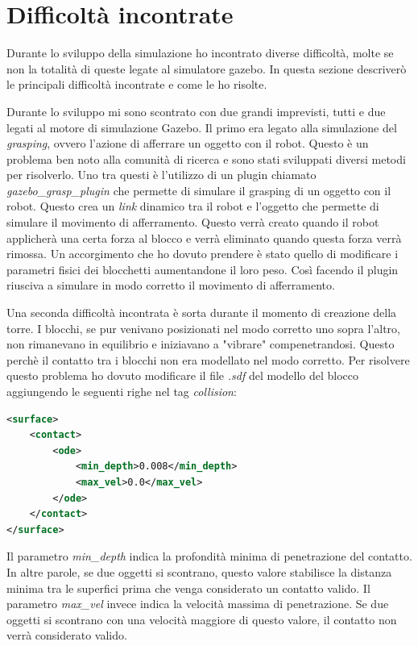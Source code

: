 \section{Difficoltà incontrate}
\label{sec:difficoltaros}
Durante lo sviluppo della simulazione ho incontrato diverse difficoltà, molte se non la totalità di queste legate al simulatore gazebo. In questa sezione descriverò le principali difficoltà incontrate e come le ho risolte.

Durante lo sviluppo mi sono scontrato con due grandi imprevisti, tutti e due legati al motore di simulazione Gazebo.
Il primo era legato alla simulazione del \textit{grasping}, ovvero l'azione di afferrare un oggetto con il robot. Questo è un problema ben noto alla comunità di ricerca e sono stati sviluppati diversi metodi per risolverlo.
Uno tra questi è l'utilizzo di un plugin chiamato \textit{gazebo\_grasp\_plugin} che permette di simulare il grasping di un oggetto con il robot. Questo crea un \textit{link} dinamico tra il robot e l'oggetto che permette di simulare il movimento di afferramento. Questo verrà creato quando il robot applicherà una certa forza al blocco e verrà eliminato quando questa forza verrà rimossa.
Un accorgimento che ho dovuto prendere è stato quello di modificare i parametri fisici dei blocchetti aumentandone il loro peso. Così facendo il plugin riusciva a simulare in modo corretto il movimento di afferramento.

Una seconda difficoltà incontrata è sorta durante il momento di creazione della torre. I blocchi, se pur venivano posizionati nel modo corretto uno sopra l'altro, non rimanevano in equilibrio e iniziavano a "vibrare" compenetrandosi. 
Questo perchè il contatto tra i blocchi non era modellato nel modo corretto. Per risolvere questo problema ho dovuto modificare il file \textit{.sdf} del modello del blocco aggiungendo le seguenti righe nel tag \textit{collision}:
\begin{lstlisting}[language=XML]
<surface>
    <contact>
        <ode>
            <min_depth>0.008</min_depth>
            <max_vel>0.0</max_vel>
        </ode>
    </contact>
</surface>
\end{lstlisting}
Il parametro \textit{min\_depth} indica la profondità minima di penetrazione del contatto. In altre parole, se due oggetti si scontrano, questo valore stabilisce la distanza minima tra le superfici prima che venga considerato un contatto valido. Il parametro \textit{max\_vel} invece indica la velocità massima di penetrazione. Se due oggetti si scontrano con una velocità maggiore di questo valore, il contatto non verrà considerato valido. 

